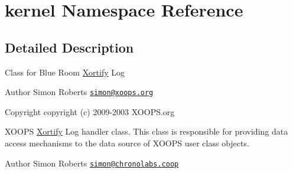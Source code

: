 \hypertarget{namespacekernel}{\section{kernel Namespace Reference}
\label{namespacekernel}
}


\subsection{Detailed Description}
Class for Blue Room \hyperlink{namespace_xortify}{Xortify} Log \begin{DoxyAuthor}{Author}
Simon Roberts \href{mailto:simon@xoops.org}{\tt simon@xoops.\-org} 
\end{DoxyAuthor}
\begin{DoxyCopyright}{Copyright}
copyright (c) 2009-\/2003 X\-O\-O\-P\-S.\-org
\end{DoxyCopyright}
X\-O\-O\-P\-S \hyperlink{namespace_xortify}{Xortify} Log handler class. This class is responsible for providing data access mechanisms to the data source of X\-O\-O\-P\-S user class objects.

\begin{DoxyAuthor}{Author}
Simon Roberts \href{mailto:simon@chronolabs.coop}{\tt simon@chronolabs.\-coop} 
\end{DoxyAuthor}

